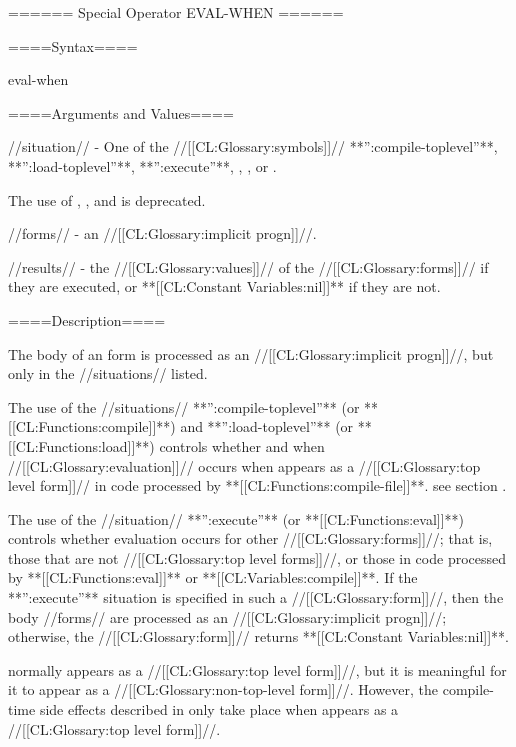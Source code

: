 ====== Special Operator EVAL-WHEN ======

====Syntax====

\DefspecWithValues eval-when { } {}

====Arguments and Values====

//situation// - One of the //[[CL:Glossary:symbols]]// **'':compile-toplevel''**, **'':load-toplevel''**, **'':execute''**, , , or .

The use of , , and  is deprecated.

//forms// - an //[[CL:Glossary:implicit progn]]//.

//results// - the //[[CL:Glossary:values]]// of the //[[CL:Glossary:forms]]// if they are executed, or **[[CL:Constant Variables:nil]]** if they are not.

====Description====

The body of an  form is processed as an //[[CL:Glossary:implicit progn]]//, but only in the //situations// listed.



The use of the //situations// **'':compile-toplevel''** (or **[[CL:Functions:compile]]**) and **'':load-toplevel''** (or **[[CL:Functions:load]]**) controls whether and when //[[CL:Glossary:evaluation]]// occurs when  appears as a //[[CL:Glossary:top level form]]// in code processed by **[[CL:Functions:compile-file]]**. see section {\secref\FileCompilation}.

The use of the //situation// **'':execute''** (or **[[CL:Functions:eval]]**) controls whether evaluation occurs for other  //[[CL:Glossary:forms]]//; that is, those that are not //[[CL:Glossary:top level forms]]//, or those in code processed by **[[CL:Functions:eval]]** or **[[CL:Variables:compile]]**. If the **'':execute''** situation is specified in such a //[[CL:Glossary:form]]//, then the body //forms// are processed as an //[[CL:Glossary:implicit progn]]//; otherwise, the  //[[CL:Glossary:form]]// returns **[[CL:Constant Variables:nil]]**.


 normally appears as a //[[CL:Glossary:top level form]]//, but it is meaningful for it to appear as a //[[CL:Glossary:non-top-level form]]//. However, the compile-time side effects described in {\secref\Compilation} only take place when  appears as a //[[CL:Glossary:top level form]]//.



